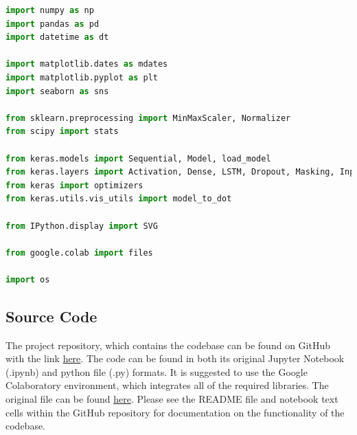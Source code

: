 \documentclass[10pt,onecolumn,letterpaper]{article}
\begin{document}
\begin{lstlisting}[language=Python, breaklines=true, label={libraries}, caption={Depiction of the list of external packages used to develop the model. These packages are roughly split by use case; mathematical structuring, data visualisation, functionalities required, machine learning tools and miscellaneous.}]
import numpy as np
import pandas as pd
import datetime as dt

import matplotlib.dates as mdates
import matplotlib.pyplot as plt
import seaborn as sns

from sklearn.preprocessing import MinMaxScaler, Normalizer
from scipy import stats

from keras.models import Sequential, Model, load_model
from keras.layers import Activation, Dense, LSTM, Dropout, Masking, Input
from keras import optimizers
from keras.utils.vis_utils import model_to_dot

from IPython.display import SVG

from google.colab import files

import os
\end{lstlisting} 

\subsection{Source Code} \label{source code}

The project repository, which contains the codebase can be found on GitHub with the link \href{https://github.com/twutang/SXNP-Factor-Models}{here}. The code can be found in both its original Jupyter Notebook (.ipynb) and python file (.py) formats. It is suggested to use the Google Colaboratory environment, which integrates all of the required libraries. The original file can be found \href{https://colab.research.google.com/drive/1IHPEI-sPNSS0rKdFThywR4LTpeOt0Z_y}{here}. Please see the README file and notebook text cells within the GitHub repository for documentation on the functionality of the codebase. 
\end{document}
